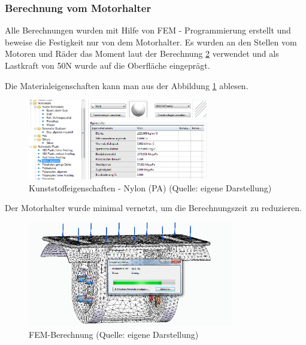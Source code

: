 \subsubsection{ Berechnung vom Motorhalter}
Alle Berechnungen wurden mit Hilfe von FEM - Programmierung erstellt und beweise die Festigkeit nur von dem Motorhalter. Es wurden an den Stellen vom Motoren und Räder das Moment laut der Berechnung \ref{FEM1} verwendet und als Lastkraft von 50N wurde auf die Oberfläche eingeprägt.

Die Materialeigenschaften kann man aus der Abbildung \ref{FEM2} ablesen.
\pagebreak
\begin{figure}[!h]  %
	\centering\includegraphics[width=0.7\textwidth]{images/FEM2.png}
	\caption{Kunststoffeigenschaften - Nylon (PA) \newline (Quelle: eigene Darstellung)}
	\label{FEM2} %
\end{figure}

Der Motorhalter wurde minimal vernetzt, um die Berechnungszeit zu reduzieren.

\begin{figure}[!h] 
	\centering\includegraphics[width=0.8\textwidth]{images/FEM.png}
	\caption{FEM-Berechnung \newline (Quelle: eigene Darstellung)}
	\label{FEM1} %
\end{figure}

